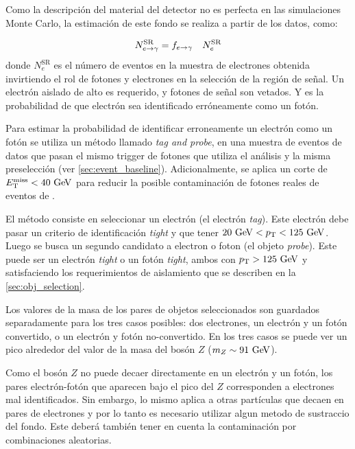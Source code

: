 Como la descripción del material del detector no es perfecta en las simulaciones Monte Carlo,
la estimación de este fondo se realiza a partir de los datos, como:

\begin{equation}
  N_{e\rightarrow\gamma}^{\mathrm{SR}} = f_{e\rightarrow\gamma} \quad N_e^{\mathrm{SR}}
\end{equation}
%
donde $N_e^{\mathrm{SR}}$ es el número de eventos en la muestra de electrones
obtenida invirtiendo el rol de fotones y electrones en la selección de la región
de señal. Un electrón aislado de alto {\pt} es requerido, y fotones de señal son
vetados. Y {\feg} es la probabilidad de que electrón sea identificado
erróneamente como un fotón.

Para estimar la probabilidad de identificar erroneamente un electrón como un
fotón {\feg} se utiliza un método llamado \emph{tag and probe}, en una muestra
de eventos de datos {\Zee} que pasan el mismo trigger de fotones que utiliza el
análisis y la misma preselección (ver \cref{sec:event_baseline}). Adicionalmente, se
aplica un corte de $\met < 40 \gev$ para reducir la posible contaminación de
fotones reales de eventos de {\wgam}.

El método consiste en seleccionar un electrón (el electrón \emph{tag}). Este
electrón debe pasar un criterio de identificación \emph{tight} y que tener $20
\gev < \pt < 125 \gev$. Luego se busca un segundo candidato a electron o foton
(el objeto \emph{probe}). Este puede ser un electrón \emph{tight} o un fotón
\emph{tight}, ambos con $\pt > 125\gev$ y satisfaciendo los requerimientos de
aislamiento que se describen en la \cref{sec:obj_selection}.

Los valores de la masa de los pares de objetos seleccionados son guardados
separadamente para los tres casos posibles: dos electrones, un electrón y un
fotón convertido, o un electrón y fotón no-convertido. En los tres casos se
puede ver un pico alrededor del valor de la masa del bosón $Z$ ($m_Z \sim 91
\gev$).

Como el bosón $Z$ no puede decaer directamente en un electrón y un fotón, los
pares electrón-fotón que aparecen bajo el pico del $Z$ corresponden a electrones
mal identificados. Sin embargo, lo mismo aplica a otras partículas que decaen en
pares de electrones y por lo tanto es necesario utilizar algun metodo de
sustraccio del fondo. Este deberá también tener en cuenta la contaminación por
combinaciones aleatorias.

